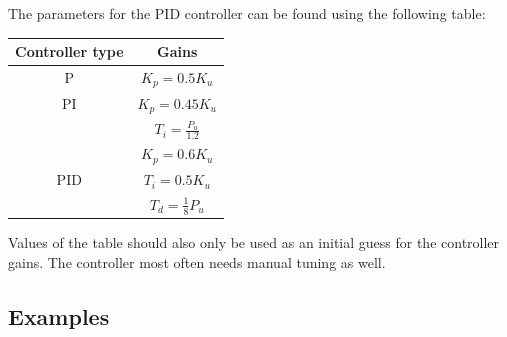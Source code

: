 The parameters for the PID controller can be found using the following table:
\begin{table}[H]
	\centering
	\begin{tabular}{|c|c|}
		\hline
		\cellcolor[HTML]{C0C0C0} \textbf{Controller type} & \cellcolor[HTML]{C0C0C0}\textbf{Gains} \\ \hline
		P                                                 & $K_p=0.5K_u$                           \\ \hline
		PI                                                & $K_p=0.45K_u$                          \\
		                                                  & $T_i=\frac{P_u}{1.2}$                  \\ \hline
		                                                  & $K_p=0.6K_u$                           \\
		PID                                               & $T_i=0.5K_u$                           \\
		                                                  & $T_d=\frac{1}{8}P_u$                   \\ \hline
	\end{tabular}
\end{table}

Values of the table should also only be used as an initial guess for the controller gains.
The controller most often needs manual tuning as well.

\subsection{Examples}
